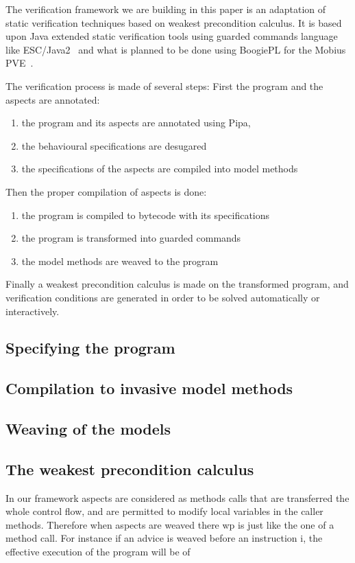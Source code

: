 The verification framework we are building in this paper is an
adaptation of static verification techniques based on weakest
precondition calculus. It is based upon Java extended static verification
tools using guarded commands language like ESC/Java2~\cite{CokK04} and
what is planned to be done using BoogiePL for the Mobius
PVE~\cite{MobiusPVE07}.


The verification process is made of several steps:
First the program and the aspects are annotated:
\begin{enumerate}
\item the program and its aspects are annotated using Pipa,
\item the behavioural specifications are desugared
\item the specifications of the aspects are compiled into model
methods
\end{enumerate}
Then the proper compilation of aspects is done:
\begin{enumerate}
\item the program is compiled to bytecode with its specifications
\item the program is transformed into guarded commands
\item the model methods are weaved to the program
\end{enumerate}
Finally a weakest precondition calculus is made on the transformed
program, and verification conditions are generated in order to be
solved automatically or interactively.


\subsection{Specifying the program}


\subsection{Compilation to invasive model methods}

\subsection{Weaving of the models}


\subsection{The weakest precondition calculus}

In our framework aspects are considered as methods calls that are
transferred the whole control flow, and are permitted to modify local
variables in the caller methods. Therefore when aspects are weaved
there wp is just like the one of a method call.  For instance if an
advice is weaved before an instruction i, the effective execution of
the program will be of

